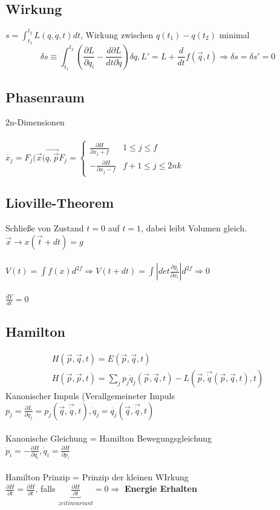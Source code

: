 \documentclass[10pt,a4paper]{article}
\begin{document}
%
\subsection{Wirkung}
$s = \int_{t_1}^{t_2}L(q,\dot{q},t)dt$, Wirkung zwischen $q(t_1)-q(t_2)$ minimal\\
%
\[
\delta s \equiv \int_{t_1}^{t_2} \left(\frac{\partial L}{\partial q_i}-\frac{d \partial L}{dt\partial \dot{q}}\right)\delta q, L'=L+\frac{d}{dt}f(\vec{q},t)\Rightarrow \delta s = \delta s'=0\]
%
\subsection{Phasenraum}
2n-Dimensionen\\
%
\\
$\dot{x_j}=F_j(\vec{x}(\vec{q,\vec{p}} F_j= \begin{cases}\frac{\partial H}{\partial x_j+f}& 1 \leq j \leq f \\ -\frac{\partial H}{\partial x_j-f} &f+1\leq j \leq 2nk \end{cases}$
% 
\subsection{Lioville-Theorem}
Schließe von Zustand $t= 0$ auf $t=1$, dabei leibt Volumen gleich. $\vec{x}\rightarrow x(\vec{t}+dt)=g$\\
%
\\
$V(t) = \int f(x)d^{2f} \Rightarrow V(t+dt)=\int |det\frac{\partial g_i}{\partial x_i}|d^{2f} \Rightarrow 0$\\
%
\\ 
$\frac{dV}{dt}=0$\\
%


\subsection{Hamilton}
\begin{eqnarray}
H(\vec{p},\vec{q},t)= E(\vec{p},\vec{q},t)\\
H(\vec{p},\vec{p},t) = \sum_j  p_j \dot{q}_j  (\vec{p},\vec{q},t)  - L(\vec{p},\vec{\dot{q}}(\vec{p},\vec{q},t),t)
\end{eqnarray}
%
Kanonischer Impuls (Verallgemeineter Impuls\\
$p_{j} = {\frac{{\partial L}}{{\partial \dot q_j }}} = p_j(\vec{q},\vec{\dot q}, t), \dot{q}_j= \dot{q_j}(\vec{q},\vec{\dot{q}}, t)$\\
%
\\
Kanonische Gleichung = Hamilton Bewegungsgleichung\\
$\dot{p}_i = -\frac{\partial H}{\partial q_i}, \dot{q}_i = \frac{\partial H}{\partial p_i} $\\
\\
%
Hamilton Prinzip = Prinzip der kleinen WIrkung\\
$\frac{\partial H}{\partial t} = \frac{\partial H}{\partial t}$, falls $\underbrace{\frac{\partial H}{\partial t}}_{zeitinvariant} = 0 \Rightarrow$ \textbf{Energie Erhalten}
%
\end{document}
